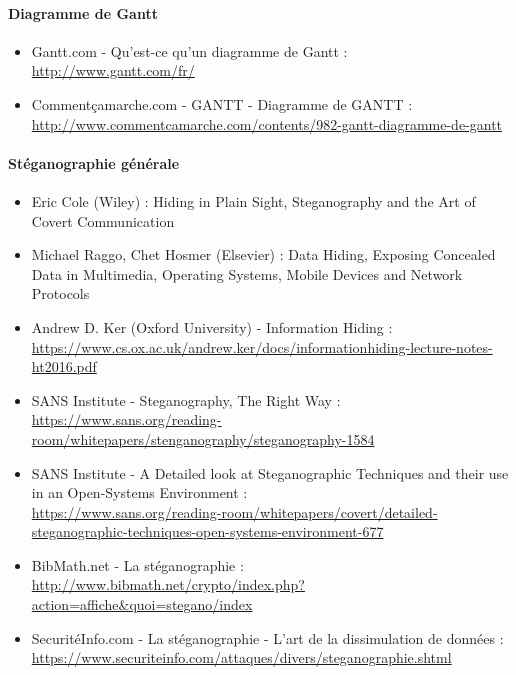 \documentclass[11pt]{article}
\begin{document}
\paragraph{Diagramme de Gantt}
\begin{itemize}
\item Gantt.com - Qu'est-ce qu'un diagramme de Gantt : \\
    \url{http://www.gantt.com/fr/}
\item Commentçamarche.com - GANTT - Diagramme de GANTT : \\
    \url{http://www.commentcamarche.com/contents/982-gantt-diagramme-de-gantt}
\end{itemize}

\paragraph{Stéganographie générale}
\begin{itemize}
\item Eric Cole (Wiley) : Hiding in Plain Sight, Steganography and the Art of Covert Communication
\item Michael Raggo, Chet Hosmer (Elsevier) : Data Hiding, Exposing Concealed
    Data in Multimedia, Operating Systems, Mobile Devices and Network Protocols
\item Andrew D. Ker (Oxford University) - Information Hiding : \\
    \url{https://www.cs.ox.ac.uk/andrew.ker/docs/informationhiding-lecture-notes-ht2016.pdf}
\item SANS Institute - Steganography, The Right Way : \\
    \url{https://www.sans.org/reading-room/whitepapers/stenganography/steganography-1584}
\item SANS Institute - A Detailed look at Steganographic Techniques and their use in an Open-Systems Environment : \\
    \url{https://www.sans.org/reading-room/whitepapers/covert/detailed-steganographic-techniques-open-systems-environment-677}
\item BibMath.net - La stéganographie : \\
    \url{http://www.bibmath.net/crypto/index.php?action=affiche&quoi=stegano/index}
\item SecuritéInfo.com - La stéganographie - L'art de la dissimulation de
    données : \\
    \url{https://www.securiteinfo.com/attaques/divers/steganographie.shtml}
\end{itemize}
\end{document}
